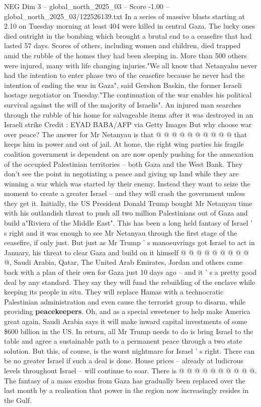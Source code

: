\begin{textsample}{NEG Dim 3 – global\_north\_2025\_03 – Score -1.00 – global\_north\_2025\_03/122526139.txt}  \label{ex:f3_neg_429}
In a series of massive blasts starting at 2.10 on Tuesday morning at least 404 were killed in central Gaza.
The lucky ones died outright in the bombing which brought a brutal end to a ceasefire that had lasted 57 days.
Scores of others, including women and children, died trapped amid the rubble of the homes they had been sleeping in.
More than 500 others were injured, many with life changing injuries."We all know that Netanyahu never had the intention to enter phase two of the ceasefire because he never had the intention of ending the war in Gaza", said Gershon Baskin, the former Israeli hostage negotiator on Tuesday."The continuation of the war enables his political survival against the will of the majority of Israelis".
An injured man searches through the rubble of his home for salvageable items after it was destroyed in an Israeli strike Credit : EYAD BABA/AFP via Getty Images But why choose war over peace?
The answer for Mr Netanyau is that @ @ @ @ @ @ @ @ @ @ that keeps him in power and out of jail.
At home, the right wing parties his fragile coalition government is dependent on are now openly pushing for the annexation of the occupied Palestinian territories -- both Gaza and the West Bank.
They don't see the point in negotiating a peace and giving up land while they are winning a war which was started by their enemy.
Instead they want to seize the moment to create a greater Israel -- and they will crash the government unless they get it.
Initially, the US President Donald Trump bought Mr Netanyau time with his outlandish threat to push all two million Palestinians out of Gaza and build a"Riviera of the Middle East".
This has been a long held fantasy of Israel ' s right and it was enough to see Mr Netanyau through the first stage of the ceasefire, if only just.
But just as Mr Trump ' s manoeuvrings got Israel to act in January, his threat to clear Gaza and build on it himself @ @ @ @ @ @ @ @ @ @, Saudi Arabia, Qatar, The United Arab Emirates, Jordan and others came back with a plan of their own for Gaza just 10 days ago -- and it ' s a pretty good deal by any standard.
They say they will fund the rebuilding of the enclave while keeping its people in situ.
They will replace Hamas with a technocratic Palestinian administration and even cause the terrorist group to disarm, while providing \textbf{peacekeepers}.
Oh, and as a special sweetener to help make America great again, Saudi Arabia says it will make inward capital investments of some \$600 billion in the US.
In return, all Mr Trump needs to do is bring Israel to the table and agree a sustainable path to a permanent peace through a two state solution.
But this, of course, is the worst nightmare for Israel ' s right.
There can be no greater Israel if such a deal is done.
House prices -- already at ludicrous levels throughout Israel -- will continue to soar.
There is @ @ @ @ @ @ @ @ @ @.
The fantasy of a mass exodus from Gaza has gradually been replaced over the last month by a realisation that power in the region now increasingly resides in the Gulf.

\end{textsample}
